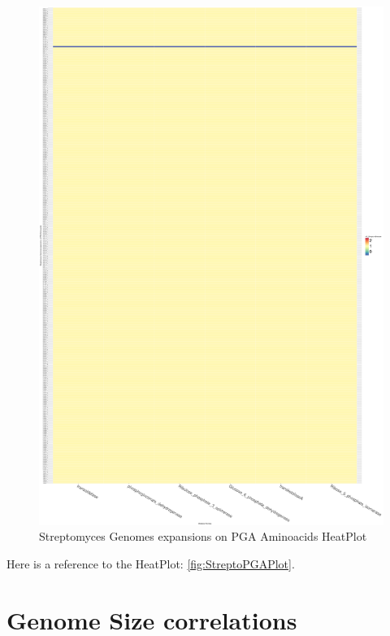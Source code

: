 \documentclass[12pt,twoside]{reedthesis}
\begin{document}
  \begin{figure}[h!tbp]
  \centering
  \includegraphics[angle = 0,scale = 0.7]{chapter4/HeatPlotStreptoPGA.pdf}
  \caption[Streptomyces Genomes expansions on PGA Aminoacids HeatPlot]{\normalsize{Streptomyces Genomes expansions on PGA Aminoacids HeatPlot}}
  \label{fig:StreptoPGAPlot}
  \end{figure}
  
  Here is a reference to the HeatPlot: \autoref{fig:StreptoPGAPlot}.
  \clearpage 
  
  \section{Genome Size correlations}\label{genome-size-correlations-1}
  
\end{document}
